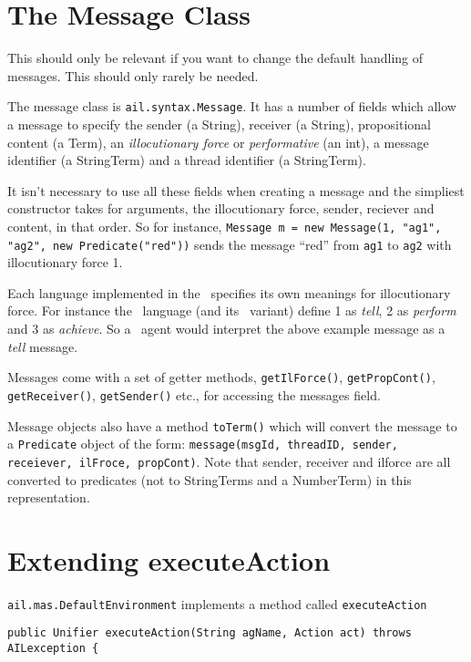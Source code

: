 \documentclass[a4]{article}
\begin{document}
\section{The Message Class}
This should only be relevant if you want to change the default handling of messages.  This should only rarely be needed.

The message class is \texttt{ail.syntax.Message}.  It has a number of fields which allow a message to specify the sender (a String), receiver (a String), propositional content (a Term), an \emph{illocutionary force} or \emph{performative} (an int), a message identifier (a StringTerm) and a thread identifier (a StringTerm).

It isn't necessary to use all these fields when creating a message and the simpliest constructor takes for arguments, the illocutionary force, sender, reciever and content, in that order.  So for instance, \texttt{Message m = new Message(1, "ag1", "ag2", new Predicate("red"))} sends the message ``red'' from \texttt{ag1} to \texttt{ag2} with illocutionary force 1.

Each language implemented in the \ail\ specifies its own meanings for illocutionary force.  For instance the \gwendolen\ language (and its \eass\ variant) define 1 as \emph{tell}, 2 as \emph{perform} and 3 as \emph{achieve}.  So a \gwendolen\ agent would interpret the above example message as a \emph{tell} message.

Messages come with a set of getter methods, \texttt{getIlForce()}, \texttt{getPropCont()}, \texttt{getReceiver()}, \texttt{getSender()} etc., for accessing the messages field.

Message objects also have a method \texttt{toTerm()} which will convert the message to a \texttt{Predicate} object of the form: \texttt{message(msgId, threadID, sender, receiever, ilFroce, propCont)}.  Note that sender, receiver and ilforce are all converted to predicates (not to StringTerms and a NumberTerm) in this representation.

\section{Extending executeAction}
\texttt{ail.mas.DefaultEnvironment} implements a method called \texttt{executeAction}

\begin{verbatim}
public Unifier executeAction(String agName, Action act) throws AILexception {
\end{verbatim}
\end{document}
